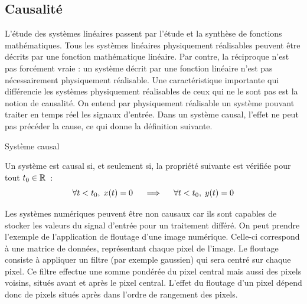 \begin{remark}{}
      
	\subsection{Causalité}
	L'étude des systèmes linéaires passent par l'étude et la
        synthèse de fonctions mathématiques. Tous les systèmes
        linéaires physiquement réalisables peuvent être décrits par
        une fonction mathématique linéaire. Par contre, la réciproque
        n'est pas forcément vraie : un système décrit par une fonction
        linéaire n'est pas nécessairement physiquement réalisable. Une
        caractéristique importante qui différencie les systèmes
        physiquement réalisables de ceux qui ne le sont pas est la
        notion de causalité. On entend par physiquement réalisable un
        système pouvant traiter en temps réel les signaux d'entrée.
        Dans un système causal, l'effet ne peut pas précéder la cause,
        ce qui donne la définition suivante.
        \begin{definition}{Système causal}
          \label{def:causal}
          
          Un système est causal si, et seulement si, la propriété suivante est vérifiée pour tout $t_0 \in\mathbb{R}$~:
          \begin{equation}
            \label{eq:def_causal}
          \forall t<t_{0} ,\;  x(t) = 0 \;\;\;\;\implies\;\;\;\; \forall t<t_{0},\; y(t) = 0
	\end{equation}   
        \end{definition}

       	Les systèmes numériques peuvent être non causaux car ils sont
        capables de stocker les valeurs du signal d'entrée pour un
        traitement différé. On peut prendre l'exemple de l'application
        de floutage d'une image numérique. Celle-ci correspond à une
        matrice de données, représentant chaque pixel de l'image. Le
        floutage consiste à appliquer un filtre (par exemple gaussien)
        qui sera centré sur chaque pixel. Ce filtre effectue une somme
        pondérée du pixel central mais aussi des pixels voisins,
        situés avant et après le pixel central. L'effet du floutage
        d'un pixel dépend donc de pixels situés après dans l'ordre de
        rangement des pixels.


\end{remark}
